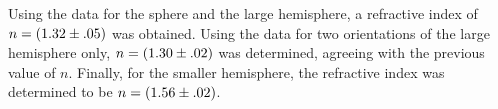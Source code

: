 \begin{paper}
		Using the data for the sphere and the large hemisphere, a refractive index of \( n = \left(1.32 \pm .05\right) \) was obtained. Using the data for two orientations of the large hemisphere only, \( n = \left(1.30 \pm .02\right) \) was determined, agreeing with the previous value of \( n \). Finally, for the smaller hemisphere, the refractive index was determined to be \( n = \left(1.56 \pm .02\right) \).



\end{paper}


